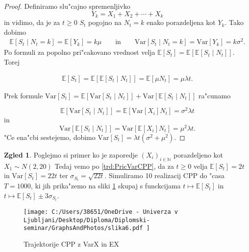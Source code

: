 \documentclass[12pt, a4paper, reqno]{amsart}
\theoremstyle{definition}
\newtheorem{zgled}[definicija]{Zgled}
\theoremstyle{plain}
\newcommand{\N}{\mathbb{N}}
\newcommand{\E}{\mathbb{E}}
\newcommand{\1}{\mathds{1}}
\newcommand{\Var}[1]{\text{Var}\left[#1\right]}
\begin{document}
        \begin{proof}

            Definiramo slu"cajno spremenljivko
            \begin{equation}
                Y_k = X_1 + X_2 + \cdots + X_k
                \label{eq:Y_k}
            \end{equation}
            in vidimo, da je za $t\geq0$ $S_t$ pogojno na $N_t = k$ enako porazdeljena 
            kot $Y_k$. Tako dobimo 
            \begin{align*}
            \E\left[S_t\mid N_t = k\right] = \E\left[Y_k\right] = k\mu \qquad \text{in} \qquad
            \Var{S_t\mid N_t = k} = \Var{Y_k} = k\sigma^2.
            \end{align*}
            Po formuli za popolno pri"cakovano vrednost velja 
            $\E\left[S_t\right] = \E\left[\E\left[S_t\mid N_t\right]\right]$. Torej

            \begin{align*}
                \E\left[S_t\right] = \E\left[\E\left[S_t\mid N_t\right]\right] = \E\left[\mu N_t\right] = \mu\lambda t.
            \end{align*}

            \noindent
            Prek formule $\Var{S_t} = \E\left[\Var{S_t\mid N_t}\right] + \Var{\E\left[S_t\mid N_t\right]}$ ra"cunamo 

            \begin{equation*}
                \E\left[\Var{S_t\mid N_t}\right] = \E\left[\Var{X_i}N_t\right] = \sigma^2\lambda t
            \end{equation*}
            in 
            \begin{equation*}
                \Var{\E\left[S_t\mid N_t\right]} = \Var{\E\left[X_i\right]N_t} = \mu^2\lambda t.
            \end{equation*}
            "Ce ena"cbi sestejemo, dobimo $\Var{S_t} = \lambda t\left(\sigma^2 + \mu^2\right)$.
        \end{proof}
    
    \begin{zgled}
        Poglejmo si primer ko je zaporedje $(X_i)_{i\in\N}$ porazdeljeno kot $X_1\sim N(2, 20)$ 
        Tedaj vemo po \ref{trd:PricVarCPP}, da za $t\geq 0 $ velja $\E\left[S_t\right] = 2t$ in 
        $\Var{S_t} = 22t$ ter $\sigma_{S_t} = \sqrt{22t}$. Simuliramo 10 realizacij CPP do "casa $T=1000$, 
        ki jih prika"zemo na sliki \ref{fig:slika6} skupaj s funckcijama $t \mapsto \E\left[S_t\right]$ in $t \mapsto \E\left[S_t\right] \pm 3\sigma_{S_t}$. 
        \begin{figure}[H]
            \centering
            \texttt{[image: 
                C:/Users/38651/OneDrive - Univerza v Ljubljani/Desktop/Diploma/Diplomski-seminar/GraphsAndPhotos/slika6.pdf
                ]}
            \caption{Trajektorije CPP z VarX in EX}
            \label{fig:slika6}
        \end{figure}

    \end{zgled}
    
\end{document}
